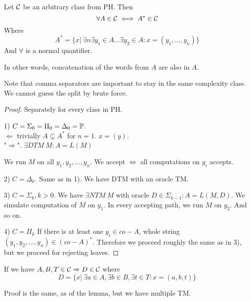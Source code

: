 
\begin{lemma}[$A^{\ast}$]
	Let $\operatorname{\mathcal{C}}$ be an arbitrary class from PH.
	Then
	\[ \forall A \in \operatorname{\mathcal{C}} \iff A^{\ast} \in \operatorname{\mathcal{C}} \]
	Where
	\[ A^{\ast} = \{ x |\ \exists n \exists y_1 \in A \ldots \exists y_2 \in A: x = (y_1, \ldots, y_n) \} \]
	And $\forall$ is a normal quantifier.

	In other words, concatenation of the words from $A$ are also in $A$.

	Note that comma separators are important to stay in the same complexity class.
	We cannot guess the split by brute force.
\end{lemma}
\begin{proof} Separately for every class in PH.

	1) $C = \Sigma_0 = \Pi_0 = \Delta_0 = \operatorname{\mathbb{P}}$.\\
	$\Leftarrow$ trivially $A \subseteq A^{\ast}$ for $n = 1$.
	$x = (y)$.\\
	"$\Rightarrow$". $\exists DTM\ M: A = L(M)$

	We run $M$ on all $y_1, y_2, \ldots, y_n$.
	We accept $\iff$ all computations on $y_i$ accepts.

	2) $C = \Delta_k$.
	Same as in 1). We have DTM with an oracle TM.

	3) $C = \Sigma_k, k > 0$.
	We have
	$ \exists NTM\ M$ with oracle $D \in \Sigma_{k - 1}: A = L(M, D)$.
	We simulate computation of $M$ on $y_1$.
	In every accepting path, we run $M$ on $y_2$. And so on.

	4) $C = \Pi_k$
	If there is at least one $y_i \in co-A$, whole string $(y_1, y_2, \ldots, y_n) \in (co-A)^{\ast}$.
	Therefore we proceed roughly the same as in 3), but we proceed for rejecting leaves.
\end{proof}

\begin{consequence}
	If we have $A,B,T \in \operatorname{\mathcal{C}} \Rightarrow D \in \operatorname{\mathcal{C}}$ where
	\[ D = \{ x |\ \exists a \in A, \exists b \in B, \exists t \in T: x = (a, b, t) \} \]

	Proof is the same, as of the lemma, but we have multiple TM.
\end{consequence}

